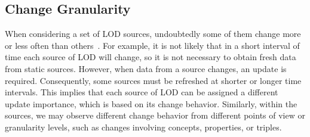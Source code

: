 \documentclass[sw]{iosart2x}
\begin{document}
%
%

\subsection{Change Granularity}\label{Granularity}

When considering a set of LOD sources, undoubtedly some of them change more or less often than others~\cite{KaferAUOH13, DividinoGSG14}. For example, it is not likely that in a short interval of time each source of LOD will change, so it is not necessary to obtain fresh data from static sources. However, when data from a source changes, an update is required. Consequently, some sources must be refreshed at shorter or longer time intervals. This implies that each source of LOD can be assigned a different update importance, which is based on its change behavior. Similarly, within the sources, we may observe different change behavior from different points of view or granularity levels, such as changes involving concepts, properties, or triples.
\end{document}
